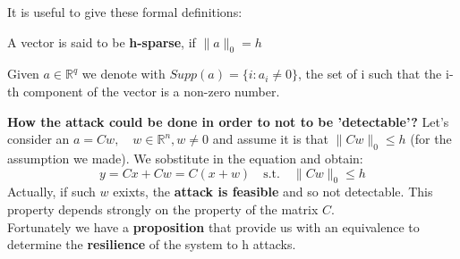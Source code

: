 \noindent
It is useful to give these formal definitions:\\
\begin{lemma}[h-sparsity]
    A vector is said to be \textbf{h-sparse}, if  $\lVert a \rVert_0 = h  $
\end{lemma}

\begin{lemma}[Support]
    Given $a\in \mathbb{R}^q$ we denote with $Supp(a)=\{i: a_i \ne 0\}$, the set of i such that the i-th component of the vector is a non-zero number.
\end{lemma}

\noindent
{\color{red} \textbf{How the attack could be done in order to not to be 'detectable'?}}
 Let's consider an $a=Cw, \quad w \in \mathbb{R}^n, w \ne 0$ and assume it is that $\lVert Cw \rVert_0 \le h$ (for the assumption we made). We sobstitute in the equation and obtain:
$$y=Cx+Cw=C(x+w) \quad \textrm{s.t.} \quad \lVert Cw \rVert_0 \le h$$
Actually, if such $w$ exixts, the \textbf{attack is feasible} and so not detectable. This property depends strongly on the property of the matrix $C$.\\
Fortunately we have a \textbf{proposition} that provide us with an equivalence to determine the \textbf{resilience} of the system to h  attacks.


\vspace{0.3cm}

 \hspace*{0mm}
%

